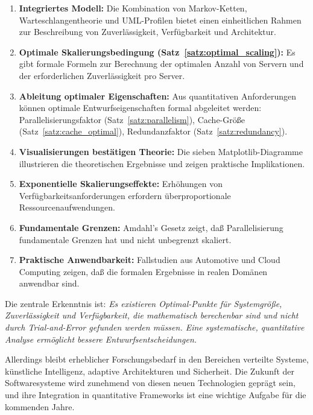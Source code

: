 \documentclass[a4paper,11pt]{article}
\theoremstyle{definition}
\begin{document}
\begin{enumerate}
    \item \textbf{Integriertes Modell:} Die Kombination von Markov-Ketten, Warteschlangentheorie 
          und UML-Profilen bietet einen einheitlichen Rahmen zur Beschreibung von 
          Zuverlässigkeit, Verfügbarkeit und Architektur.
    
    \item \textbf{Optimale Skalierungsbedingung (Satz~\ref{satz:optimal_scaling}):} 
          Es gibt formale Formeln zur Berechnung der optimalen Anzahl von Servern und der 
          erforderlichen Zuverlässigkeit pro Server.
    
    \item \textbf{Ableitung optimaler Eigenschaften:} Aus quantitativen Anforderungen können 
          optimale Entwurfseigenschaften formal abgeleitet werden: Parallelisierungsfaktor 
          (Satz~\ref{satz:parallelism}), Cache-Größe (Satz~\ref{satz:cache_optimal}), 
          Redundanzfaktor (Satz~\ref{satz:redundancy}).
    
    \item \textbf{Visualisierungen bestätigen Theorie:} Die sieben Matplotlib-Diagramme 
          illustrieren die theoretischen Ergebnisse und zeigen praktische Implikationen.
    
    \item \textbf{Exponentielle Skalierungseffekte:} Erhöhungen von Verfügbarkeitsanforderungen 
          erfordern überproportionale Ressourcenaufwendungen.
    
    \item \textbf{Fundamentale Grenzen:} Amdahl's Gesetz zeigt, daß Parallelisierung 
          fundamentale Grenzen hat und nicht unbegrenzt skaliert.
    
    \item \textbf{Praktische Anwendbarkeit:} Fallstudien aus Automotive und Cloud Computing 
          zeigen, daß die formalen Ergebnisse in realen Domänen anwendbar sind.
\end{enumerate}

Die zentrale Erkenntnis ist: \emph{Es existieren Optimal-Punkte für Systemgröße, Zuverlässigkeit und Verfügbarkeit, 
die mathematisch berechenbar sind und nicht durch Trial-and-Error gefunden werden müssen. 
Eine systematische, quantitative Analyse ermöglicht bessere Entwurfsentscheidungen.}

Allerdings bleibt erheblicher Forschungsbedarf in den Bereichen verteilte Systeme, 
künstliche Intelligenz, adaptive Architekturen und Sicherheit. Die Zukunft der 
Softwaresysteme wird zunehmend von diesen neuen Technologien geprägt sein, und ihre 
Integration in quantitative Frameworks ist eine wichtige Aufgabe für die kommenden Jahre.
\end{document}
